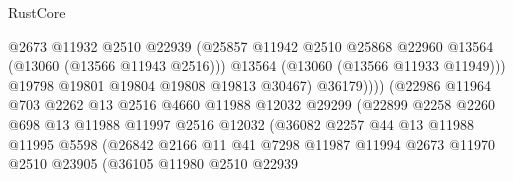 \begin{lexlean}{RustCore}
\begin{coremodule}
                                        @2673
                                        @11932
                                        @2510
                                        @22939
                                        (@25857
                                          @11942
                                          @2510
                                          @25868
                                          @22960
                                          @13564
                                          (@13060 (@13566 @11943 @2516)))
                                        @13564
                                        (@13060 (@13566 @11933 @11949)))
                                      @19798
                                      @19801
                                      @19804
                                      @19808
                                      @19813
                                      @30467)
                                    @36179))))
                            (@22986
                              @11964
                              @703
                              @2262
                              @13
                              @2516
                              @4660
                              @11988
                              @12032
                              @29299
                              (@22899
                                @2258
                                @2260
                                @698
                                @13
                                @11988
                                @11997
                                @2516
                                @12032
                                (@36082
                                  @2257
                                  @44
                                  @13
                                  @11988
                                  @11995
                                  @5598
                                  (@26842
                                    @2166
                                    @11
                                    @41
                                    @7298
                                    @11987
                                    @11994
                                    @2673
                                    @11970
                                    @2510
                                    @23905
                                    (@36105
                                      @11980
                                      @2510
                                      @22939

\end{coremodule}
\end{lexlean}
